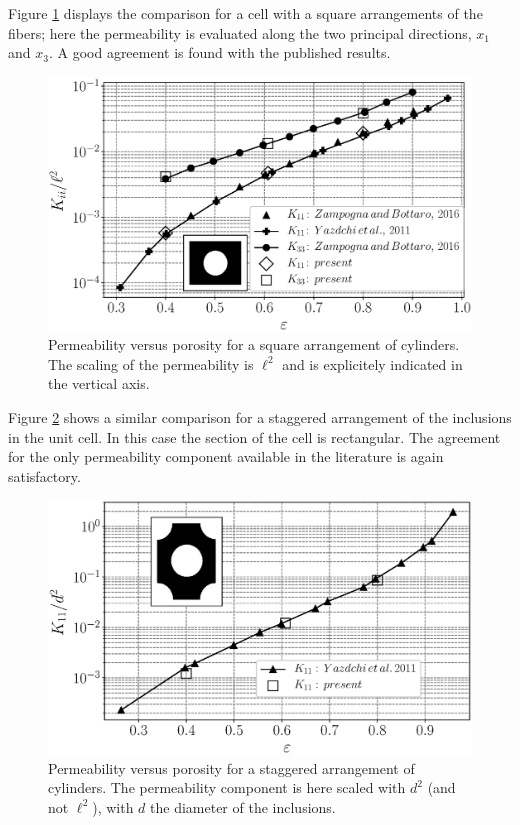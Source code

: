 Figure \ref{fig:square} displays the comparison for a cell with a square arrangements  of the fibers; here the permeability is evaluated along the two principal directions, $x_1$ and $x_3$.
A good agreement is found with the published results. 
\begin{figure}[t]
	\centering
	\includegraphics[width=0.8\linewidth]{chapter_4/figure/square}
	\caption{Permeability versus porosity for a square arrangement of cylinders. The scaling of the permeability is $\ell^2$ and is explicitely indicated in the vertical axis.}
	\label{fig:square}
\end{figure}
Figure \ref{fig:hexa} shows a similar comparison for a staggered arrangement of the inclusions in the unit cell. In this case the section of the cell is rectangular. The agreement for the only permeability component available in the literature is again satisfactory.
\begin{figure}[h]
	\centering
	\includegraphics[width=0.8\linewidth]{chapter_4/figure/hexa}
	\caption{Permeability versus porosity for a staggered arrangement of cylinders. The permeability component is here scaled with $d^2$ (and not $\ell^2$), with $d$ the diameter of the inclusions.}
	\label{fig:hexa}
\end{figure}

